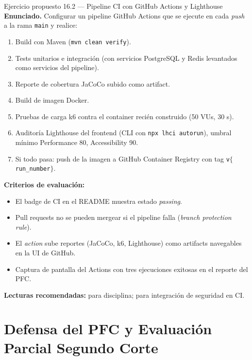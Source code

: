 \begin{cajaejercicio}{Ejercicio propuesto 16.2 --- Pipeline CI con GitHub Actions y Lighthouse}
\textbf{Enunciado.} Configurar un pipeline GitHub Actions que se
ejecute en cada \emph{push} a la rama \texttt{main} y realice:
\begin{enumerate}
\item Build con Maven (\texttt{mvn clean verify}).
\item Tests unitarios e integración (con servicios PostgreSQL y
Redis levantados como servicios del pipeline).
\item Reporte de cobertura JaCoCo subido como artifact.
\item Build de imagen Docker.
\item Pruebas de carga k6 contra el container recién construido
(50 VUs, 30 s).
\item Auditoría Lighthouse del frontend (CLI con \texttt{npx lhci
autorun}), umbral mínimo Performance 80, Accessibility 90.
\item Si todo pasa: push de la imagen a GitHub Container Registry
con tag \texttt{v$\{$run\_number$\}$}.
\end{enumerate}

\textbf{Criterios de evaluación:}
\begin{itemize}
\item El badge de CI en el README muestra estado \emph{passing}.
\item Pull requests no se pueden mergear si el pipeline falla
(\emph{branch protection rule}).
\item El \emph{action} sube reportes (JaCoCo, k6, Lighthouse) como
artifacts navegables en la UI de GitHub.
\item Captura de pantalla del Actions con tres ejecuciones exitosas
en el reporte del PFC.
\end{itemize}

\textbf{Lecturas recomendadas:} \cite{martin2017clean} para
disciplina; \cite{ortega2022securecoding} para integración de
seguridad en CI.
\end{cajaejercicio}

\chapter{Defensa del PFC y Evaluación Parcial Segundo Corte}
\label{cap:semana17}

